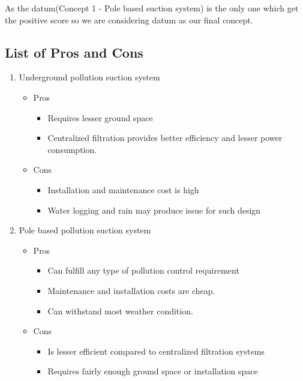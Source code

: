 \documentclass[12pt]{article}
\begin{document}
As the datum(Concept 1 - Pole based suction system) is the only one which get the positive score so we are considering datum as our final concept.

\newpage

\subsection{List of Pros and Cons}

\begin{enumerate}
\item Underground pollution suction system

\begin{itemize}
\item Pros
\begin{itemize}
\item Requires lesser ground space
\item Centralized filtration provides better efficiency and lesser power consumption. 
\end{itemize}
\end{itemize}

\begin{itemize}
\item Cons
\begin{itemize}
\item Installation and maintenance cost is high
\item Water logging and rain may produce issue for such design
\end{itemize}
\end{itemize}

\item  Pole based pollution suction system

\begin{itemize}
\item Pros
\begin{itemize}
\item Can fulfill any type of pollution control requirement 
\item Maintenance and installation costs are cheap.
\item Can withstand most weather condition.
\end{itemize}
\end{itemize}

\begin{itemize}
\item Cons
\begin{itemize}
\item Is lesser efficient compared to centralized filtration systems
\item Requires fairly enough ground space or installation space
\end{itemize}
\end{itemize}



\end{enumerate}
\end{document}
